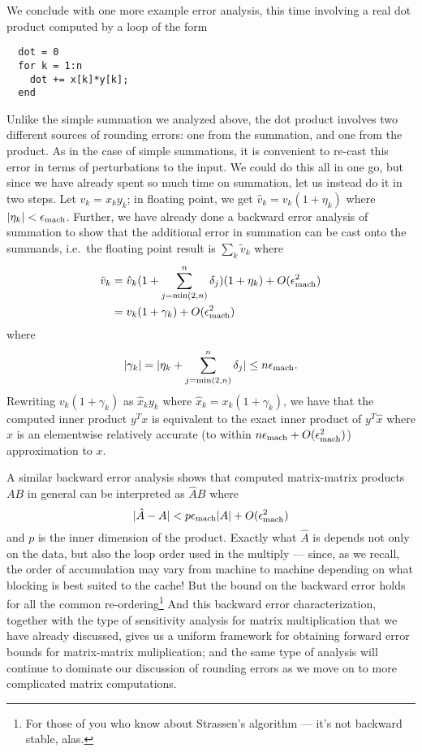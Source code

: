 \documentclass[12pt, leqno]{article} %
\begin{document}
We conclude with one more example error analysis, this time involving
a real dot product computed by a loop of the form
\begin{lstlisting}
  dot = 0
  for k = 1:n
    dot += x[k]*y[k];
  end
\end{lstlisting}
Unlike the simple summation we analyzed above, the dot product involves
two different sources of rounding errors: one from the summation,
and one from the product.  As in the case of simple summations, it is
convenient to re-cast this error in terms of perturbations to the input.
We could do this all in one go, but since we have already spent so much
time on summation, let us instead do it in two steps.  Let $v_k = x_k y_k$;
in floating point, we get $\hat{v}_k = v_k (1+\eta_k)$
where $|\eta_k| < \epsilon_{\mathrm{mach}}$.  Further,
we have already done a backward error analysis of summation to show
that the additional error in summation can be cast onto the summands,
i.e.~the floating point result is $\sum_k \tilde{v}_k$ where
\begin{align*}
  \tilde{v}_k
  &= \hat{v}_k (1 + \sum_{j=\min(2,n)}^n \delta_j) (1 + \eta_k) + O(\epsilon_{\mathrm{mach}}^2) \\
  &= v_k (1+\gamma_k) + O(\epsilon_{\mathrm{mach}}^2)
\end{align*}
where
\[
  |\gamma_k| = |\eta_k + \sum_{j=\min(2,n)}^n \delta_j| \leq n \epsilon_{\mathrm{mach}}.
\]
Rewriting $v_k(1+\gamma_k)$ as $\hat{x}_k y_k$ where
$\hat{x}_k = x_k (1+\gamma_k)$, we have that the computed inner
product $y^T x$ is equivalent to the exact inner product of $y^T \hat{x}$
where $\hat{x}$ is an elementwise relatively accurate
(to within $n \epsilon_{\mathrm{mach}} + O(\epsilon_{\mathrm{mach}}^2)$) approximation to $x$.

A similar backward error analysis shows that computed matrix-matrix
products $AB$ in general can be interpreted as $\hat{A} B$ where
\[
  |\hat{A}-A| < p \epsilon_{\mathrm{mach}} |A| + O(\epsilon_{\mathrm{mach}}^2)
\]
and $p$ is the inner dimension of the product.  Exactly what $\hat{A}$
is depends not only on the data, but also the loop order used in the
multiply --- since, as we recall, the order of accumulation may vary
from machine to machine depending on what blocking is best suited to
the cache!  But the bound on the backward error holds for all the common
re-ordering\footnote{%
For those of you who know about Strassen's algorithm --- it's not
backward stable, alas.
}
And this backward error characterization, together with the
type of sensitivity analysis for matrix multiplication that we have
already discussed, gives us a uniform framework for obtaining
forward error bounds for matrix-matrix muliplication; and the same
type of analysis will continue to dominate our discussion of rounding
errors as we move on to more complicated matrix computations.
\end{document}
